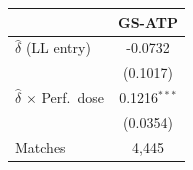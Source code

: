 \begin{tabular}{lc}
\toprule
 & GS-ATP \\
\midrule
$\hat{\delta}$ (LL entry) & -0.0732 \\
 & (0.1017) \\
$\hat{\delta}$ $\times$ Perf.\ dose & 0.1216$^{***}$ \\
 & (0.0354) \\
\midrule
Matches & 4,445 \\
\bottomrule
\end{tabular}
